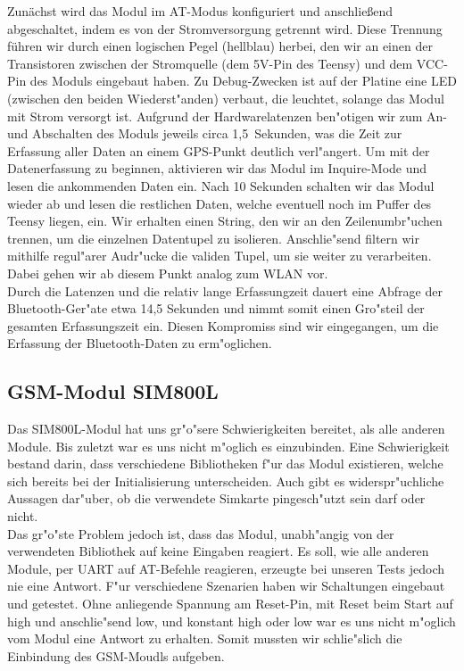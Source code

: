 \documentclass[a4paper,11pt, ngerman]{scrartcl}
\begin{document}
Zunächst wird das Modul im AT-Modus konfiguriert und anschließend abgeschaltet, indem es von der Stromversorgung getrennt wird. Diese Trennung führen wir durch einen logischen Pegel (hellblau) herbei, den wir an einen der Transistoren zwischen der Stromquelle (dem 5V-Pin des Teensy) und dem VCC-Pin des Moduls eingebaut haben. Zu Debug-Zwecken ist auf der Platine eine LED (zwischen den beiden Wiederst"anden) verbaut, die leuchtet, solange das Modul mit Strom versorgt ist. Aufgrund der Hardwarelatenzen ben"otigen wir zum An- und Abschalten des Moduls jeweils circa 1,5~Sekunden, was die Zeit zur Erfassung aller Daten an einem GPS-Punkt deutlich verl"angert. Um mit der Datenerfassung zu beginnen, aktivieren wir das Modul im Inquire-Mode und lesen die ankommenden Daten ein. Nach 10 Sekunden schalten wir das Modul wieder ab und lesen die restlichen Daten, welche eventuell noch im Puffer des Teensy liegen, ein. Wir erhalten einen String, den wir an den Zeilenumbr"uchen trennen, um die einzelnen Datentupel zu isolieren. Anschlie"send filtern wir mithilfe regul"arer Audr"ucke die validen Tupel, um sie weiter zu verarbeiten. Dabei gehen wir ab diesem Punkt analog zum WLAN vor.\\
Durch die Latenzen und die relativ lange Erfassungzeit dauert eine Abfrage der Bluetooth-Ger"ate etwa 14,5 Sekunden und nimmt somit einen Gro"steil der gesamten Erfassungszeit ein. Diesen Kompromiss sind wir eingegangen, um die Erfassung der Bluetooth-Daten zu erm"oglichen.
\subsection{GSM-Modul SIM800L}
Das SIM800L-Modul hat uns gr"o"sere Schwierigkeiten bereitet, als alle anderen Module. Bis zuletzt war es uns nicht m"oglich es einzubinden. Eine Schwierigkeit bestand darin, dass verschiedene Bibliotheken f"ur das Modul existieren, welche sich bereits bei der Initialisierung unterscheiden. Auch gibt es widerspr"uchliche Aussagen dar"uber, ob die verwendete Simkarte pingesch"utzt sein darf oder nicht.\\
Das gr"o"ste Problem jedoch ist, dass das Modul, unabh"angig von der verwendeten Bibliothek auf keine Eingaben reagiert. Es soll, wie alle anderen Module, per UART auf AT-Befehle reagieren, erzeugte bei unseren Tests jedoch nie eine Antwort. 
F"ur verschiedene Szenarien haben wir Schaltungen eingebaut und getestet. Ohne anliegende Spannung am Reset-Pin, mit Reset beim Start auf high und anschlie"send low, und konstant high oder low war es uns nicht m"oglich vom Modul eine Antwort zu erhalten. Somit mussten wir schlie"slich die Einbindung des GSM-Moudls aufgeben.
\end{document}
